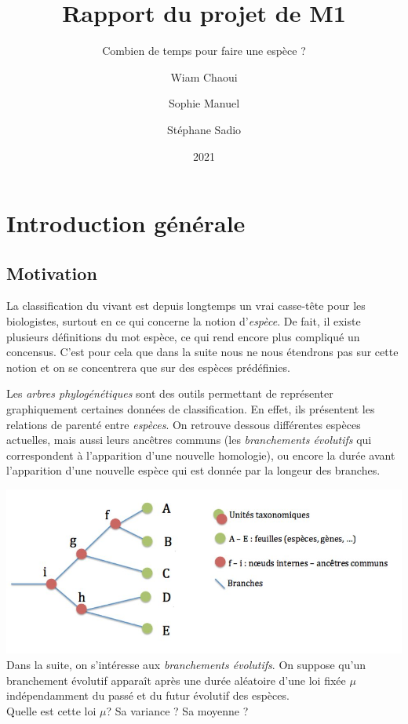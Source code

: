 \documentclass[
]{article}
\title{Rapport du projet de M1}
\subtitle{Combien de temps pour faire une espèce ?}
\author{Wiam Chaoui \and Sophie Manuel \and Stéphane Sadio}
\date{2021}
\begin{document}
\maketitle

\newtheorem{definition}{Définition}
\newtheorem{exemple}{Exemple}
\newtheorem{corollary}{Corollaire}
\newtheorem*{proposition}{Proposition}
\newtheorem{lemma}{Lemme}
\newtheorem*{demonstration}{Démonstration}
\newtheorem{remark}{Remarque}
\newtheorem{propetie}{Propriété}
\newtheorem{theorem}{Théorème}
\newpage
\tableofcontents
\newpage

\section{Introduction générale}

\subsection{Motivation}

\hspace*{0.5cm} La classification du vivant est depuis longtemps un vrai
casse-tête pour les biologistes, surtout en ce qui concerne la notion
d'\emph{espèce}. De fait, il existe plusieurs définitions du mot espèce,
ce qui rend encore plus compliqué un concensus. C'est pour cela que dans
la suite nous ne nous étendrons pas sur cette notion et on se
concentrera que sur des espèces prédéfinies.

Les \emph{arbres phylogénétiques} sont des outils permettant de
représenter graphiquement certaines données de classification. En effet,
ils présentent les relations de parenté entre \emph{espèces}. On
retrouve dessous différentes espèces actuelles, mais aussi leurs
ancêtres communs (les \emph{branchements évolutifs} qui correspondent à
l'apparition d'une nouvelle homologie), ou encore la durée avant
l'apparition d'une nouvelle espèce qui est donnée par la longeur des
branches.

\includegraphics{Images/arbre_intro.jpg} Dans la suite, on s'intéresse
aux \emph{branchements évolutifs}. On suppose qu'un branchement évolutif
apparaît après une durée aléatoire d'une loi fixée \(\mu\)
indépendamment du passé et du futur évolutif des espèces.\\
Quelle est cette loi \(\mu\)? Sa variance ? Sa moyenne ? \newline
\end{document}
